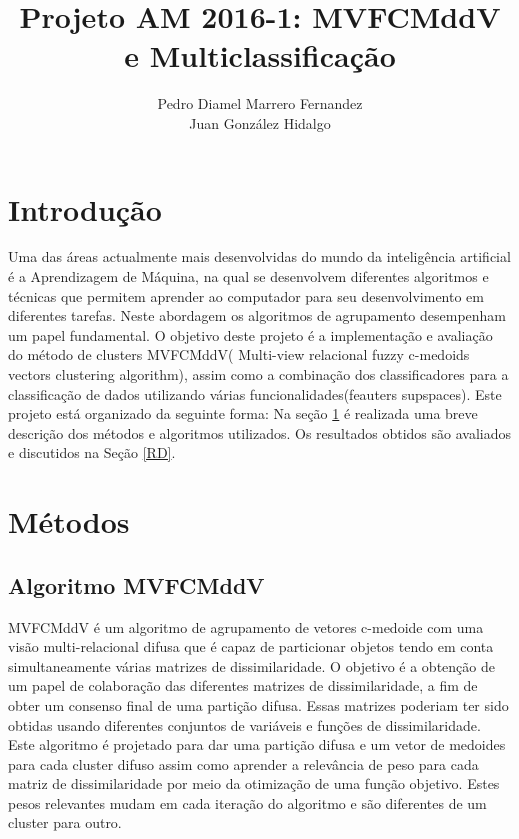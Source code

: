 \documentclass[12pt]{article}
\author{Pedro Diamel Marrero Fernandez \\ Juan González Hidalgo}
\title{Projeto AM 2016-1: MVFCMddV e Multiclassificação}
\begin{document}
\maketitle



\section*{Introdução}

Uma das áreas actualmente mais desenvolvidas do mundo da inteligência artificial é a Aprendizagem de Máquina, na qual se desenvolvem diferentes algoritmos e técnicas que permitem aprender ao computador para seu desenvolvimento em diferentes tarefas. Neste abordagem os algoritmos de agrupamento desempenham um papel fundamental. O objetivo deste projeto é a implementação e avaliação do método de clusters MVFCMddV( Multi-view relacional fuzzy c-medoids vectors clustering algorithm), assim como a combinação dos classificadores para a classificação de dados utilizando várias funcionalidades(feauters supspaces). Este projeto está organizado da seguinte forma: Na seção \ref{MET} é realizada uma breve descrição dos métodos e algoritmos utilizados. Os resultados obtidos são avaliados e discutidos na Seção \ref{RD}.

\section{Métodos}\label{MET}

\subsection{Algoritmo MVFCMddV}

MVFCMddV é um algoritmo de agrupamento de vetores c-medoide com uma visão multi-relacional difusa que é capaz de particionar objetos tendo em conta simultaneamente várias matrizes de dissimilaridade. O objetivo é a obtenção de um papel de colaboração das diferentes matrizes de dissimilaridade, a fim de obter um consenso final de uma partição difusa.
Essas matrizes poderiam ter sido obtidas usando diferentes conjuntos de variáveis e funções de dissimilaridade. Este algoritmo é projetado para dar uma partição difusa e um vetor de medoides para cada cluster difuso assim como aprender a relevância de peso para cada matriz de dissimilaridade por meio da otimização de uma função objetivo. Estes pesos relevantes mudam em cada iteração do algoritmo e são diferentes de um cluster para outro.
\end{document}
